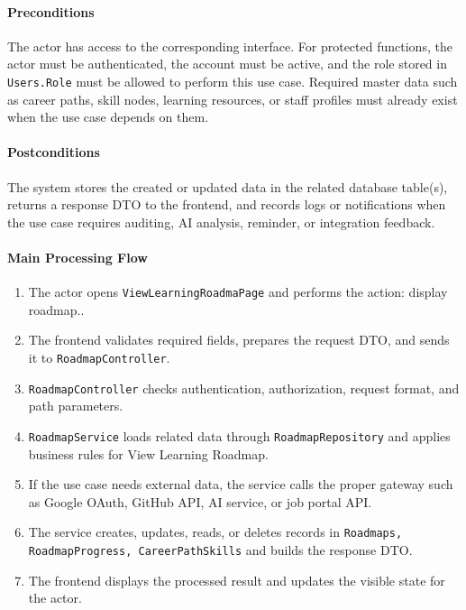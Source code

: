 \paragraph{Preconditions}

The actor has access to the corresponding interface. For protected functions, the actor must be authenticated, the account must be active, and the role stored in \texttt{Users.Role} must be allowed to perform this use case. Required master data such as career paths, skill nodes, learning resources, or staff profiles must already exist when the use case depends on them.

\paragraph{Postconditions}

The system stores the created or updated data in the related database table(s), returns a response DTO to the frontend, and records logs or notifications when the use case requires auditing, AI analysis, reminder, or integration feedback.

\paragraph{Main Processing Flow}

\begin{enumerate}
    \item The actor opens \texttt{ViewLearningRoadmaPage} and performs the action: display roadmap..
    \item The frontend validates required fields, prepares the request DTO, and sends it to \texttt{RoadmapController}.
    \item \texttt{RoadmapController} checks authentication, authorization, request format, and path parameters.
    \item \texttt{RoadmapService} loads related data through \texttt{RoadmapRepository} and applies business rules for View Learning Roadmap.
    \item If the use case needs external data, the service calls the proper gateway such as Google OAuth, GitHub API, AI service, or job portal API.
    \item The service creates, updates, reads, or deletes records in \texttt{Roadmaps, RoadmapProgress, CareerPathSkills} and builds the response DTO.
    \item The frontend displays the processed result and updates the visible state for the actor.
\end{enumerate}

